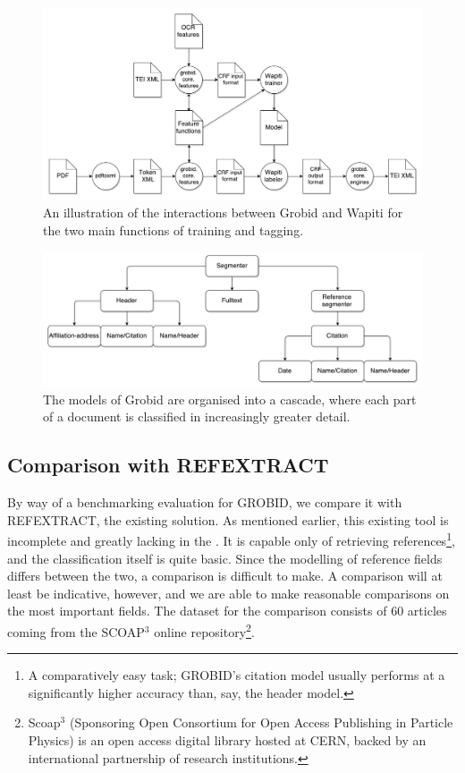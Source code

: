 \begin{figure}[!ht]
\center
\includegraphics[width=\textwidth]{Figures/grobid.pdf}
\caption{An illustration of the interactions between Grobid and Wapiti for the two main functions of training and tagging.}
\label{fig:grobid}
\end{figure}

\begin{figure}[!ht]
\center
\includegraphics[width=\textwidth]{Figures/cascade.pdf}
\caption{The models of Grobid are organised into a cascade, where each part of a document is classified in increasingly greater detail.}
\label{fig:cascade}
\end{figure}

\subsection{Comparison with REFEXTRACT}

By way of a benchmarking evaluation for GROBID, we compare it with REFEXTRACT, the existing solution. As mentioned earlier, this existing tool is incomplete and greatly lacking in the . It is capable only of retrieving references\footnote{A comparatively easy task; GROBID's citation model usually performs at a significantly higher accuracy than, say, the header model.}, and the classification itself is quite basic. Since the modelling of reference fields differs between the two, a comparison is difficult to make. A comparison will at least be indicative, however, and we are able to make reasonable comparisons on the most important fields. The dataset for the comparison consists of 60 articles coming from the SCOAP$^3$ online repository\footnote{Scoap$^3$ (Sponsoring Open Consortium for Open Access Publishing in Particle Physics) is an open access digital library hosted at CERN, backed by an international partnership of research institutions.}.

